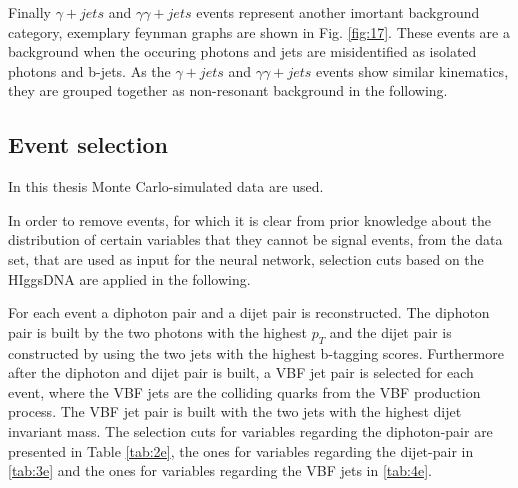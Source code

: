 Finally $\gamma  + jets$ and $\gamma \gamma  + jets$ events represent another imortant background category, exemplary feynman graphs are shown in Fig. \ref{fig:17}.
These events are a background when the occuring photons and jets are misidentified as isolated photons and b-jets. 
As the  $\gamma  + jets$ and $\gamma \gamma  + jets$ events show similar kinematics, they are grouped together as non-resonant background in the following.

\subsection{Event selection}
\label{sec:HiggsDNA}

In this thesis Monte Carlo-simulated data are used. 

In order to remove events, for which it is clear from prior knowledge about the distribution of certain
variables that they cannot be signal events, from the data set, that are used as input for the neural network, selection cuts based on the HIggsDNA are applied in the following.

For each event a diphoton pair and a dijet pair is reconstructed. The diphoton pair is built by the two photons with the highest $p_T$ and the dijet pair is constructed by using the two jets
with the highest b-tagging scores.
Furthermore after the diphoton and dijet pair is built, a VBF jet pair is selected for each event, where the VBF jets are the colliding quarks from the VBF production process. The VBF jet pair is built with the two jets with the highest
dijet invariant mass. 
The selection cuts for variables regarding the diphoton-pair are presented in Table \ref{tab:2e}, the ones for variables regarding the dijet-pair in \ref{tab:3e} and the ones for variables regarding the VBF jets in \ref{tab:4e}. \\

